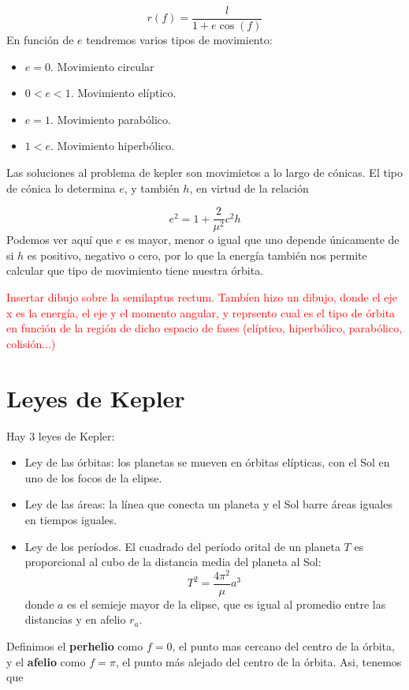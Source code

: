 \begin{equation}
    r(f) = \frac{l}{1+e\cos(f)}
\end{equation}
En función de $e$ tendremos varios tipos de movimiento: 

\begin{itemize}
    \item $e=0$. Movimiento circular
    \item $0<e<1$. Movimiento elíptico.
    \item $e=1$. Movimiento parabólico.
    \item $1<e$. Movimiento hiperbólico.
\end{itemize}
Las soluciones al problema de kepler son movimietos a lo largo de cónicas. El tipo de cónica lo determina $e$, y también $h$, en virtud de la relación

\begin{equation}
    e^2 = 1 + \frac{2}{\mu^2} c^2 h
\end{equation}
Podemos ver aquí que $e$ es mayor, menor o igual que uno depende únicamente de si $h$ es positivo, negativo o cero, por lo que la energía también nos permite calcular que tipo de movimiento tiene nuestra órbita.
\begin{Anotacion}
    \textcolor{red}{Insertar dibujo sobre la semilaptus rectum. Tambíen hizo un dibujo, donde el eje x es la energía, el eje y el momento angular, y reprsento cual es el tipo de órbita en función de la región de dicho espacio de fases (elíptico, hiperbólico, parabólico, colisión...)}
\end{Anotacion}

\section{Leyes de Kepler}

Hay 3 leyes de Kepler:

\begin{itemize}
    \item Ley de las órbitas: los planetas se mueven en órbitas elípticas, con el Sol en uno de los focos de la elipse. 
    \item Ley de las áreas: la línea que conecta un planeta y el Sol barre áreas iguales en tiempos iguales.
    \item Ley de los períodos. El cuadrado del período orital de un planeta $T$ es proporcional al cubo de la distancia media del planeta al Sol: 
    \begin{equation}
        T^2 = \frac{4\pi^2}{\mu}a^3
    \end{equation}
    donde $a$ es el semieje mayor de la elipse, que es igual al promedio entre las distancias y en afelio $r_a$. 
\end{itemize}
Definimos el \textbf{perhelio} como $f=0$, el punto mas cercano del centro de la órbita, y el \textbf{afelio} como $f=\pi$, el punto más alejado del centro de la órbita. Asi, tenemos que 

